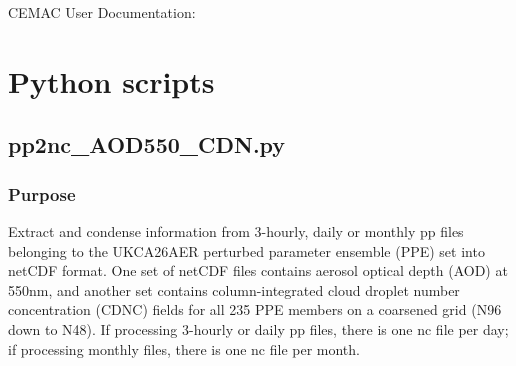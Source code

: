\documentclass[10pt,a4paper]{article}
\begin{document}
\begin{center}
\vspace*{0.5cm}
{\Huge CEMAC User Documentation: \Project}
\end{center}
\vspace*{0.5cm}

\section{Python scripts}

\subsection{pp2nc\_AOD550\_CDN.py}

\subsubsection{Purpose}

Extract and condense information from 3-hourly, daily or monthly pp files belonging to the UKCA26AER
         perturbed parameter ensemble (PPE) set into netCDF format. One set of netCDF files
         contains aerosol optical depth (AOD) at 550nm, and another set contains column-integrated
         cloud droplet number concentration (CDNC) fields for all 235 PPE members on a coarsened
         grid (N96 down to N48). If processing 3-hourly or daily pp files, there is one nc file per day;
         if processing monthly files, there is one nc file per month.
\end{document}
